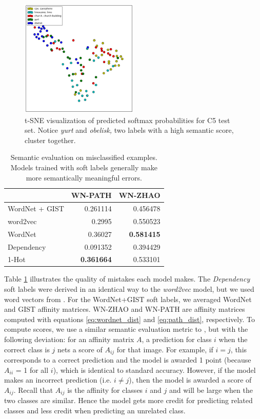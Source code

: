 \begin{figure}[t]
  \centering
  \includegraphics[width=0.5\textwidth]{figs/tsne.png}
  \caption{
      t-SNE visualization of predicted softmax probabilities for C5 test set.
      Notice \emph{yurt} and \emph{obelisk,} two labels with a high semantic
      score, cluster together.
  }
  \label{fig:tsne}
\end{figure}

\begin{table}[!tb]
    \centering
    \begin{tabular}{lrr}
         & WN-PATH & WN-ZHAO\\
        \hline
        WordNet + GIST & 0.261114 & 0.456478\\
        word2vec & 0.2995 & 0.550523\\
        WordNet & 0.36027 & \textbf{0.581415}\\
        Dependency & 0.091352 & 0.394429\\
        1-Hot & \textbf{0.361664} & 0.533101\\
    \end{tabular}
  \caption{
      Semantic evaluation on misclassified examples. Models trained with soft
      labels generally make more semantically meaningful errors.
  }
  \label{tbl:semantic_misses}
\end{table}

Table \ref{tbl:semantic_misses} illustrates the quality of mistakes each model
makes. The \emph{Dependency} soft labels were derived in an identical way to the
\emph{word2vec} model, but we used word vectors from \cite{levy2014dependency}.
For the WordNet+GIST soft labels, we averaged WordNet and GIST affinity
matrices. WN-ZHAO and WN-PATH are affinity matrices computed with equations
\ref{eq:wordnet_dist} and \ref{eq:path_dist}, respectively. To compute scores,
we use a similar semantic evaluation metric to \cite{zhao2011large}, but with
the following deviation: for an affinity matrix $A$, a prediction for class $i$
when the correct class is $j$ nets a score of $A_{ij}$ for that image. For
example, if $i = j$, this corresponds to a correct prediction and the model is
awarded 1 point (because $A_{ii}$ = 1 for all $i$), which is identical to
standard accuracy. However, if the model makes an incorrect prediction (i.e. $i
\neq j$), then the model is awarded a score of $A_{ij}$.  Recall that $A_{ij}$
is the affinity for classes $i$ and $j$ and will be large when the two classes
are similar. Hence the model gets more credit for predicting related classes and
less credit when predicting an unrelated class.

